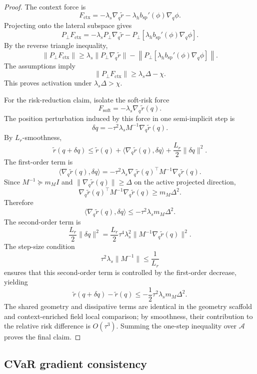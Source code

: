 \begin{proof}
The context force is
\[
    F_{\mathrm{ctx}}
    =
    -\lambda_s\nabla_q\widetilde r
    -
    \lambda_h b_{\mathrm{sp}}'(\phi)\nabla_q\phi .
\]
Projecting onto the lateral subspace gives
\[
    P_\perp F_{\mathrm{ctx}}
    =
    -\lambda_sP_\perp\nabla_q\widetilde r
    -
    P_\perp\!\left[
    \lambda_h b_{\mathrm{sp}}'(\phi)\nabla_q\phi
    \right].
\]
By the reverse triangle inequality,
\[
    \|P_\perp F_{\mathrm{ctx}}\|
    \ge
    \lambda_s\|P_\perp\nabla_q\widetilde r\|
    -
    \left\|
    P_\perp\!\left[
    \lambda_h b_{\mathrm{sp}}'(\phi)\nabla_q\phi
    \right]
    \right\|.
\]
The assumptions imply
\[
    \|P_\perp F_{\mathrm{ctx}}\|\ge \lambda_s\Delta-\chi.
\]
This proves activation under \(\lambda_s\Delta>\chi\).

For the risk-reduction claim, isolate the soft-risk force
\[
    F_{\mathrm{soft}}=-\lambda_s\nabla_q\widetilde r(q).
\]
The position perturbation induced by this force in one semi-implicit step is
\[
    \delta q
    =
    -\tau^2\lambda_sM^{-1}\nabla_q\widetilde r(q).
\]
By \(L_r\)-smoothness,
\[
    \widetilde r(q+\delta q)
    \le
    \widetilde r(q)
    +
    \langle\nabla_q\widetilde r(q),\delta q\rangle
    +
    \frac{L_r}{2}\|\delta q\|^2 .
\]
The first-order term is
\[
    \langle\nabla_q\widetilde r(q),\delta q\rangle
    =
    -\tau^2\lambda_s
    \nabla_q\widetilde r(q)^\top
    M^{-1}
    \nabla_q\widetilde r(q).
\]
Since \(M^{-1}\succeq m_MI\) and
\(\|\nabla_q\widetilde r(q)\|\ge \Delta\) on the active projected direction,
\[
    \nabla_q\widetilde r(q)^\top M^{-1}\nabla_q\widetilde r(q)
    \ge
    m_M\Delta^2.
\]
Therefore
\[
    \langle\nabla_q\widetilde r(q),\delta q\rangle
    \le
    -\tau^2\lambda_s m_M\Delta^2.
\]
The second-order term is
\[
    \frac{L_r}{2}\|\delta q\|^2
    =
    \frac{L_r}{2}
    \tau^4\lambda_s^2
    \|M^{-1}\nabla_q\widetilde r(q)\|^2 .
\]
The step-size condition
\[
    \tau^2\lambda_s\|M^{-1}\|\le \frac{1}{L_r}
\]
ensures that this second-order term is controlled by the first-order decrease, yielding
\[
    \widetilde r(q+\delta q)-\widetilde r(q)
    \le
    -\frac12\tau^2\lambda_s m_M\Delta^2.
\]
The shared geometry and dissipative terms are identical in the geometry scaffold and context-enriched field
local comparison; by smoothness, their contribution to the relative risk difference is
\(O(\tau^3)\). Summing the one-step inequality over \(\mathcal A\) proves the final
claim.
\end{proof}

\subsection{CVaR gradient consistency}

